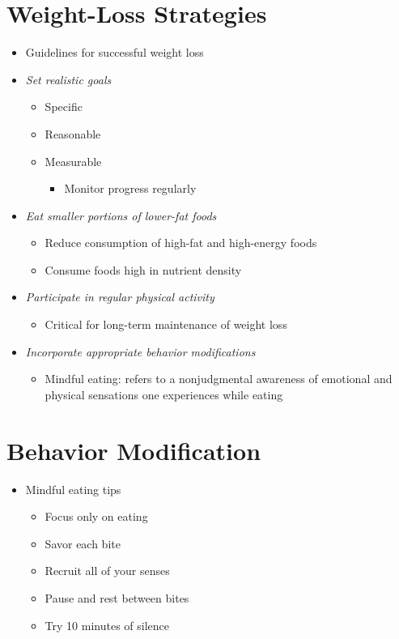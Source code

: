 \documentclass[title={Chapter 10: Achieving and Maintaining a Healthful Body Weight}]{fdsn201notes}
\begin{document}
\section{Weight-Loss Strategies}\label{sec:weight-loss-strategies}
\begin{itemize}
	\item Guidelines for successful weight loss
	\item \emph{Set realistic goals}
	\begin{itemize}
		\item Specific
		\item Reasonable
		\item Measurable
		\begin{itemize}
			\item Monitor progress regularly
		\end{itemize}
	\end{itemize}
	\item \emph{Eat smaller portions of lower-fat foods}
	\begin{itemize}
		\item Reduce consumption of high-fat and high-energy foods
		\item Consume foods high in nutrient density
	\end{itemize}
	\item \emph{Participate in regular physical activity}
	\begin{itemize}
		\item Critical for long-term maintenance of weight loss
	\end{itemize}
	\item \emph{Incorporate appropriate behavior modifications}
	\begin{itemize}
		\item Mindful eating: refers to a nonjudgmental awareness of emotional and physical sensations one experiences while eating
	\end{itemize}
\end{itemize}

\section{Behavior Modification}\label{sec:behavior-modification}
\begin{itemize}
	\item Mindful eating tips
	\begin{itemize}
		\item Focus only on eating
		\item Savor each bite
		\item Recruit all of your senses
		\item Pause and rest between bites
		\item Try 10 minutes of silence
	\end{itemize}
\end{itemize}
\end{document}
